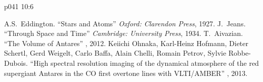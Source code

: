 \vsetoff
\vs p041 10:6 
\quizlink
\begin{thebibliography}{100}
A.S.~Eddington.
{``Stars and Atoms''}
{\em Oxford: Clarendon Press}, 1927.
J.~Jeans.
{``Through Space and Time''}
{\em Cambridge: University Press}, 1934.
T.~Aivazian.
{``The Volume of Antares''}
{\em {}}, 2012.
Keiichi Ohnaka, Karl-Heinz Hofmann, Dieter Schertl, Gerd Weigelt, Carlo Baffa, Alain Chelli, Romain Petrov, Sylvie Robbe-Dubois.
{``High spectral resolution imaging of the dynamical atmosphere of the red supergiant Antares in the CO first overtone lines with VLTI/AMBER''}
{\em {}}, 2013.
\end{thebibliography}

